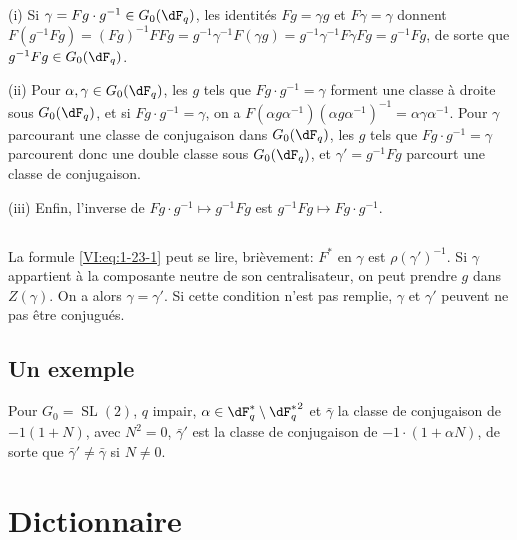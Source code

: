 (i) Si $\gamma= F g\cdot g^{-1}\in G_0(\dF_q)$, les identités $F g=\gamma g$ 
et 
$F\gamma=\gamma$ donnent $F(g^{-1} F g) = (F g)^{-1} F F g = g^{-1} \gamma^{-1} F(\gamma g) = g^{-1} \gamma^{-1} F \gamma F g = g^{-1} F g$, 
de sorte que $g^{-1} F g \in G_0(\dF_q)$. 

(ii) Pour $\alpha,\gamma\in G_0(\dF_q)$, les $g$ tels que 
$F g\cdot g^{-1} = \gamma$ forment une classe à droite sous $G_0(\dF_q)$, et 
si $F g\cdot g^{-1} = \gamma$, on a 
$F(\alpha g \alpha^{-1})(\alpha g \alpha^{-1})^{-1} = \alpha \gamma\alpha^{-1}$. 
Pour $\gamma$ parcourant une classe de conjugaison dans $G_0(\dF_q)$, les $g$ 
tels que $F g\cdot g^{-1} = \gamma$ parcourent donc une double classe sous 
$G_0(\dF_q)$, et $\gamma'= g^{-1} F g$ parcourt une classe de conjugaison. 

(iii) Enfin, l'inverse de $F g\cdot g^{-1}\mapsto g^{-1} F g$ est 
$g^{-1} F g\mapsto F g\cdot g^{-1}$. 





\subsection{}\label{VI:1-25}

La formule \eqref{VI:eq:1-23-1} peut se lire, brièvement: $F^\ast$ en 
$\gamma$ est $\rho(\gamma')^{-1}$. Si $\gamma$ appartient à la composante 
neutre de son centralisateur, on peut prendre $g$ dans $Z(\gamma)$. On a alors 
$\gamma=\gamma'$. Si cette condition n'est pas remplie, $\gamma$ et $\gamma'$ 
peuvent ne pas être conjugués. 





\subsection{Un exemple}\label{VI:1-26}

Pour $G_0=\operatorname{SL}(2)$, $q$ impair, 
$\alpha\in \dF_q^\ast\setminus {\dF_q^\ast}^2$ et $\bar\gamma$ la classe de 
conjugaison de $-1(1+N)$, avec $N^2=0$, $\bar\gamma'$ est la classe de 
conjugaison de $-1\cdot (1+\alpha N)$, de sorte que $\bar\gamma'\ne \bar\gamma$ 
si $N\ne 0$. 










\section{Dictionnaire}\label{VI:2}

